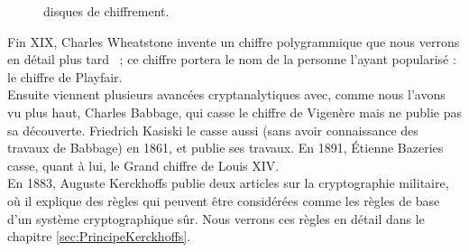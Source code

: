 \begin{figure}[h]
  \begin{center}
    \hspace{1.5cm}
  \end{center}
  \vspace{-10pt}
  \caption{disques de chiffrement.}
  \vspace{-10pt}
  \label{fig:JeffersonDisks}
\end{figure}

Fin XIX\ieme, Charles Wheatstone invente un chiffre
polygrammique que nous verrons en détail plus tard ~; ce chiffre
portera le nom de la personne l'ayant popularisé : le chiffre
  de Playfair. \\

Ensuite viennent plusieurs avancées cryptanalytiques avec, comme nous
l'avons vu plus haut, Charles Babbage, qui casse le chiffre de
Vigenère mais ne publie pas sa découverte. Friedrich Kasiski
le casse aussi (sans avoir connaissance des travaux de
Babbage) en 1861, et publie ses travaux. En 1891, Étienne
  Bazeries casse, quant à lui, le Grand chiffre de Louis XIV. 
\\

En 1883, Auguste Kerckhoffs publie deux articles sur la
cryptographie militaire, où il explique des règles qui peuvent être
considérées comme les règles de base d'un système cryptographique
sûr. Nous verrons ces règles en détail dans le chapitre
\ref{sec:PrincipeKerckhoffs}. \\
\clearpage
